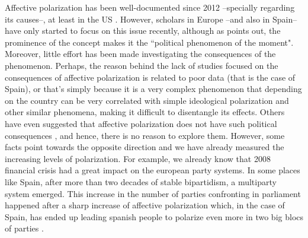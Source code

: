 \documentclass[a4paper, svgnames]{article}
\begin{document}
Affective polarization has been well-documented since 2012 --specially regarding its causes--, at least in the US \citep{Iyengar2012,Hetherington2015,Rogowski2016a, Webster2017,Lelkes2018,Iyengar2019, Klein2020}. However, scholars in Europe --and also in Spain-- have only started to focus on this issue recently, although as \cite{Miller2019} points out, the prominence of the concept makes it the ``political phenomenon of the moment". Moreover, little effort has been made investigating the consequences of the phenomenon. Perhaps, the reason behind the lack of studies focused on the consequences of affective polarization is related to poor data (that is the case of Spain), or that's simply because it is a very complex phenomenon that depending on the country can be very correlated with simple ideological polarization and other similar phenomena, making it difficult to disentangle its effects. Others have even suggested that affective polarization does not have such political consequences \citep*{broockmanDoesAffectivePolarization2020}, and hence, there is no reason to explore them. However, some facts point towards the opposite direction and we have already measured the increasing levels of polarization. For example, we already know that 2008 financial crisis had a great impact on the european party systems. In some places like Spain, after more than two decades of stable bipartidism, a multiparty system emerged. This increase in the number of parties confronting in parliament happened after a sharp increase of affective polarization which, in the case of Spain, has ended up leading spanish people to polarize even more in two big blocs of parties \citep{Orriols2020}.
\end{document}
